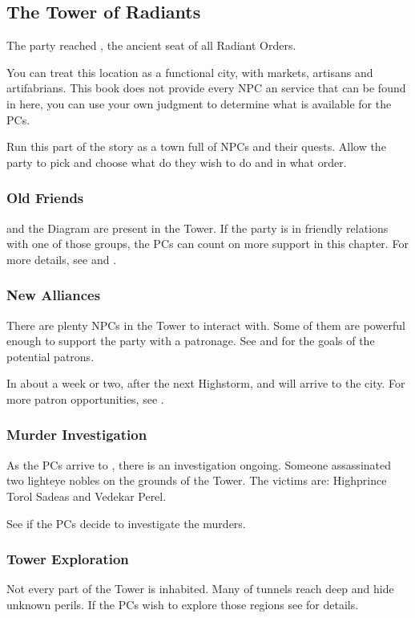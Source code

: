 \subsection{The Tower of Radiants}
\label{ssec:urithiruTower}

The party reached \locationUrithiru{}, the ancient seat of all Radiant Orders.

You can treat this location as a functional city, with markets, artisans and artifabrians. This book does not provide every NPC an service that can be found in here, you can use your own judgment to determine what is available for the PCs.

Run this part of the story as a town full of NPCs and their quests. Allow the party to pick and choose what do they wish to do and in what order.

\subsubsection{Old Friends}

\npcFractionGhostbloods{} and the Diagram are present in the Tower. If the party is in friendly relations with one of those groups, the PCs can count on more support in this chapter. For more details, see  and .

\subsubsection{New Alliances}

There are plenty NPCs in the Tower to interact with. Some of them are powerful enough to support the party with a patronage. See  and  for the goals of the potential patrons.

In about a week or two, after the next Highstorm, \npcKaladin{} and \npcJasnah{} will arrive to the city. For more patron opportunities, see .

\subsubsection{Murder Investigation}

As the PCs arrive to \locationUrithiru{}, there is an investigation ongoing. Someone assassinated two lighteye nobles on the grounds of the Tower. The victims are: Highprince Torol Sadeas and Vedekar Perel.

See  if the PCs decide to investigate the murders.

\subsubsection{Tower Exploration}

Not every part of the Tower is inhabited. Many of tunnels reach deep and hide unknown perils. If the PCs wish to explore those regions see  for details.